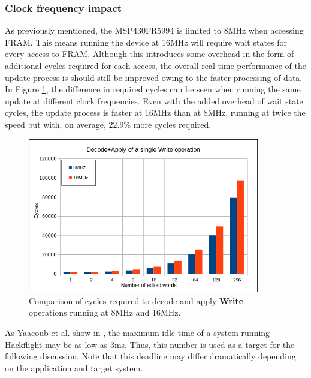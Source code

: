 \subsubsection{Clock frequency impact}
As previously mentioned, the MSP430FR5994 is limited to 8MHz when accessing FRAM. This means running the device at 16MHz will require wait states for every access to FRAM. Although this introduces some overhead in the form of additional cycles required for each access, the overall real-time performance of the update process is should still be improved owing to the faster processing of data.  
In Figure \ref{fig:w8vs16}, the difference in required cycles can be seen when running the same update at different clock frequencies. Even with the added overhead of wait state cycles, the update process is faster at 16MHz than at 8MHz, running at twice the speed but with, on average, $22.9\%$ more cycles required. 
\begin{figure}[!ht]
    \centering
    \includegraphics[width=0.9\textwidth]{img/W8vs16.png}
    \caption{Comparison of cycles required to decode and apply \textbf{Write} operations running at 8MHz and 16MHz.}
    \label{fig:w8vs16}
\end{figure}

As Yaacoub et al. show in \cite{NeRTA}, the maximum idle time of a system running Hackflight may be as low as 3ms. Thus, this number is used as a target for the following discussion. Note that this deadline may differ dramatically depending on the application and target system. 

